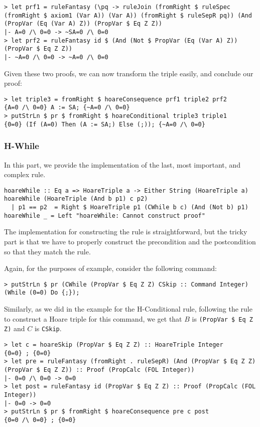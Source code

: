 \documentclass{article}
\begin{document}
\begin{lstlisting}
> let prf1 = ruleFantasy (\pq -> ruleJoin (fromRight $ ruleSpec (fromRight $ axiom1 (Var A)) (Var A)) (fromRight $ ruleSepR pq)) (And (PropVar (Eq (Var A) Z)) (PropVar $ Eq Z Z))
|- A=0 /\ 0=0 -> ~SA=0 /\ 0=0
> let prf2 = ruleFantasy id $ (And (Not $ PropVar (Eq (Var A) Z)) (PropVar $ Eq Z Z))
|- ~A=0 /\ 0=0 -> ~A=0 /\ 0=0
\end{lstlisting}

Given these two proofs, we can now transform the triple easily, and conclude our proof:

\begin{lstlisting}
> let triple3 = fromRight $ hoareConsequence prf1 triple2 prf2
{A=0 /\ 0=0} A := SA; {~A=0 /\ 0=0}
> putStrLn $ pr $ fromRight $ hoareConditional triple3 triple1
{0=0} (If (A=0) Then (A := SA;) Else (;)); {~A=0 /\ 0=0}
\end{lstlisting}

\subsubsection{H-While}

In this part, we provide the implementation of the last, most important, and complex rule.

\begin{lstlisting}
hoareWhile :: Eq a => HoareTriple a -> Either String (HoareTriple a)
hoareWhile (HoareTriple (And b p1) c p2)
  | p1 == p2  = Right $ HoareTriple p1 (CWhile b c) (And (Not b) p1)
hoareWhile _ = Left "hoareWhile: Cannot construct proof"
\end{lstlisting}

The implementation for constructing the rule is straightforward, but the tricky part is that we have to properly construct the precondition and the postcondition so that they match the rule.

Again, for the purposes of example, consider the following command:

\begin{lstlisting}
> putStrLn $ pr (CWhile (PropVar $ Eq Z Z) CSkip :: Command Integer)
(While (0=0) Do {;});
\end{lstlisting}

Similarly, as we did in the example for the H-Conditional rule, following the rule to construct a Hoare triple for this command, we get that $B$ is \texttt{(PropVar \$ Eq Z Z)} and $C$ is \texttt{CSkip}.

\begin{lstlisting}
> let c = hoareSkip (PropVar $ Eq Z Z) :: HoareTriple Integer
{0=0} ; {0=0}
> let pre = ruleFantasy (fromRight . ruleSepR) (And (PropVar $ Eq Z Z) (PropVar $ Eq Z Z)) :: Proof (PropCalc (FOL Integer))
|- 0=0 /\ 0=0 -> 0=0
> let post = ruleFantasy id (PropVar $ Eq Z Z) :: Proof (PropCalc (FOL Integer))
|- 0=0 -> 0=0
> putStrLn $ pr $ fromRight $ hoareConsequence pre c post
{0=0 /\ 0=0} ; {0=0}
\end{lstlisting}
\end{document}
